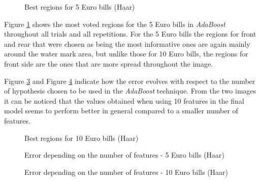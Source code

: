 \documentclass[11pt,twocolumn]{article}
\begin{document}
		\begin{figure}[!hbtp]
			\centering
			\caption{Best regions for 5 Euro bills (Haar)}
			\label{haar_regions5}
		\end{figure}

		Figure \ref{haar_regions5} shows the most voted regions for the 5 Euro bills in \emph{AdaBoost} throughout all trials and all repetitions. For the 5 Euro bills the regions for front and rear that were chosen as being the most informative ones are again mainly around the water mark area, but unlike those for 10 Euro bills, the regions for front side are the ones that are more spread throughout the image.

		Figure \ref{haar_plot5} and Figure \ref{haar_plot10} indicate how the error evolves with respect to the number of hypothesis chosen to be used in the \emph{AdaBoost} technique. From the two images it can be noticed that the values obtained when using 10 features in the final model seems to perform better in general compared to a smaller number of features.

		\begin{figure}[!hbtp]
			\centering
			\caption{Best regions for 10 Euro bills (Haar)}
			\label{haar_regions10}
		\end{figure}

		\begin{figure}[!hbtp]
			\centering
			\caption{Error depending on the number of features - 5 Euro bills (Haar)}
			\label{haar_plot5}
		\end{figure} 

		\begin{figure}[!hbtp]
			\centering
			\caption{Error depending on the number of features - 10 Euro bills (Haar)}
			\label{haar_plot10}
		\end{figure} 
\end{document}
